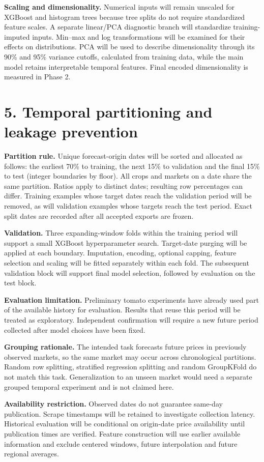\documentclass[11pt,a4paper]{article}
\begin{document}
\textbf{Scaling and dimensionality.} Numerical inputs will remain unscaled for XGBoost and histogram trees because tree splits do not require standardized feature scales. A separate linear/PCA diagnostic branch will standardize training-imputed inputs. Min--max and log transformations will be examined for their effects on distributions. PCA will be used to describe dimensionality through its 90\% and 95\% variance cutoffs, calculated from training data, while the main model retains interpretable temporal features. Final encoded dimensionality is measured in Phase 2.
\newpage
\section*{5. Temporal partitioning and leakage prevention}
\textbf{Partition rule.} Unique forecast-origin dates will be sorted and allocated as follows: the earliest 70\% to training, the next 15\% to validation and the final 15\% to test (integer boundaries by floor). All crops and markets on a date share the same partition. Ratios apply to distinct dates; resulting row percentages can differ. Training examples whose target dates reach the validation period will be removed, as will validation examples whose targets reach the test period. Exact split dates are recorded after all accepted exports are frozen.

\textbf{Validation.} Three expanding-window folds within the training period will support a small XGBoost hyperparameter search. Target-date purging will be applied at each boundary. Imputation, encoding, optional capping, feature selection and scaling will be fitted separately within each fold. The subsequent validation block will support final model selection, followed by evaluation on the test block.

\textbf{Evaluation limitation.} Preliminary tomato experiments have already used part of the available history for evaluation. Results that reuse this period will be treated as exploratory. Independent confirmation will require a new future period collected after model choices have been fixed.

\textbf{Grouping rationale.} The intended task forecasts future prices in previously observed markets, so the same market may occur across chronological partitions. Random row splitting, stratified regression splitting and random GroupKFold do not match this task. Generalization to an unseen market would need a separate grouped temporal experiment and is not claimed here.

\textbf{Availability restriction.} Observed dates do not guarantee same-day publication. Scrape timestamps will be retained to investigate collection latency. Historical evaluation will be conditional on origin-date price availability until publication times are verified. Feature construction will use earlier available information and exclude centered windows, future interpolation and future regional averages.
\end{document}
